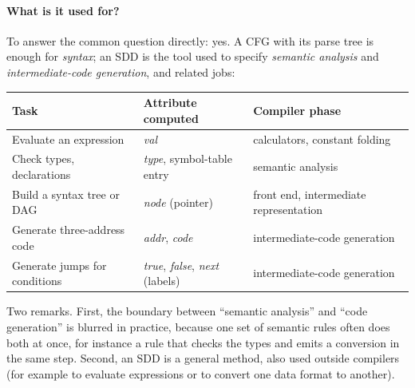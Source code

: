 \documentclass[11pt,a4paper]{article}
\begin{document}
\paragraph{What is it used for?} To answer the common question directly: yes. A CFG with its parse tree is enough for \emph{syntax}; an SDD is the tool used to specify \emph{semantic analysis} and \emph{intermediate-code generation}, and related jobs:
\begin{center}
\small
\begin{tabular}{@{}L{4.0cm} L{4.8cm} L{5.4cm}@{}}
\toprule
\textbf{Task} & \textbf{Attribute computed} & \textbf{Compiler phase} \\ \midrule
Evaluate an expression & \textit{val} & calculators, constant folding \\
Check types, declarations & \textit{type}, symbol-table entry & semantic analysis \\
Build a syntax tree or DAG & \textit{node} (pointer) & front end, intermediate representation \\
Generate three-address code & \textit{addr}, \textit{code} & intermediate-code generation \\
Generate jumps for conditions & \textit{true}, \textit{false}, \textit{next} (labels) & intermediate-code generation \\ \bottomrule
\end{tabular}
\end{center}
Two remarks. First, the boundary between ``semantic analysis'' and ``code generation'' is blurred in practice, because one set of semantic rules often does both at once, for instance a rule that checks the types and emits a conversion in the same step. Second, an SDD is a general method, also used outside compilers (for example to evaluate expressions or to convert one data format to another).
\end{document}
